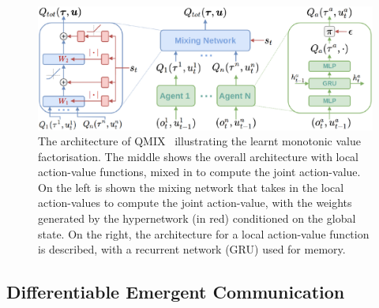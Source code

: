 \begin{figure}
    \centering
    \includegraphics[width=0.8\linewidth]{Figures/MADRL/qmix.png}
    \caption{The architecture of QMIX~\citep{Rashid2018_QMIX} illustrating the learnt monotonic value factorisation. The middle shows the overall architecture with local action-value functions, mixed in to compute the joint action-value. On the left is shown the mixing network that takes in the local action-values to compute the joint action-value, with the weights generated by the hypernetwork (in red) conditioned on the global state. On the right, the architecture for a local action-value function is described, with a recurrent network (GRU) used for memory.}
    \label{fig:QMIX}
\end{figure}



\subsection{Differentiable Emergent Communication}\label{sec:MADRL:EmergentCommunication}

